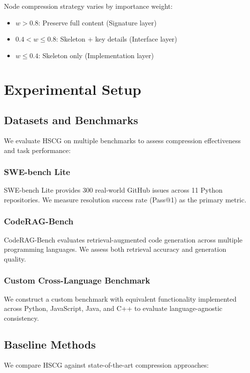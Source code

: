\documentclass[conference]{IEEEtran}
\begin{document}
Node compression strategy varies by importance weight:
\begin{itemize}
    \item $w > 0.8$: Preserve full content (Signature layer)
    \item $0.4 < w \leq 0.8$: Skeleton + key details (Interface layer)  
    \item $w \leq 0.4$: Skeleton only (Implementation layer)
\end{itemize}

\section{Experimental Setup}

\subsection{Datasets and Benchmarks}

We evaluate HSCG on multiple benchmarks to assess compression effectiveness and task performance:

\subsubsection{SWE-bench Lite}
SWE-bench Lite \cite{jimenez2024swebench} provides 300 real-world GitHub issues across 11 Python repositories. We measure resolution success rate (Pass@1) as the primary metric.

\subsubsection{CodeRAG-Bench}
CodeRAG-Bench \cite{zhou2024coderagbench} evaluates retrieval-augmented code generation across multiple programming languages. We assess both retrieval accuracy and generation quality.

\subsubsection{Custom Cross-Language Benchmark}
We construct a custom benchmark with equivalent functionality implemented across Python, JavaScript, Java, and C++ to evaluate language-agnostic consistency.

\subsection{Baseline Methods}

We compare HSCG against state-of-the-art compression approaches:
\end{document}
